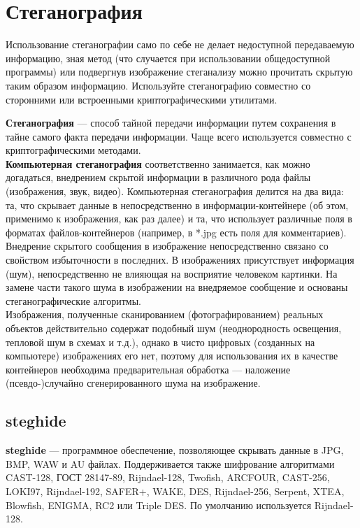 \section{Стеганография}
\begin{important}
Использование стеганографии само по себе не делает недоступной передаваемую информацию, зная метод (что случается при использовании общедоступной программы) или подвергнув изображение стеганализу можно прочитать скрытую таким образом информацию. Используйте стеганографию совместно со сторонними или встроенными криптографическими утилитами.
\end{important}
\textbf{Стеганография} --- способ тайной передачи информации путем сохранения в тайне самого факта передачи информации. Чаще всего используется совместно с криптографическими методами.\\
\textbf{Компьютерная стеганография} соответственно занимается, как можно догадаться, внедрением скрытой информации в различного рода файлы (изображения, звук, видео). Компьютерная стеганография делится на два вида: та, что скрывает данные в непосредственно в информации-контейнере (об этом, применимо к изображения, как раз далее) и та, что использует различные поля в форматах файлов-контейнеров (например, в *.jpg есть поля для комментариев).\\
Внедрение скрытого сообщения в изображение непосредственно связано со свойством избыточности в последних. В изображениях присутствует информация (шум), непосредственно не влияющая на восприятие человеком картинки. На замене части такого шума в изображении на внедряемое сообщение и основаны стеганографические алгоритмы.\\
Изображения, полученные сканированием (фотографированием) реальных объектов действительно содержат подобный шум (неоднородность освещения, тепловой шум в схемах и т.д.), однако в чисто цифровых (созданных на компьютере) изображениях его нет, поэтому для использования их в качестве контейнеров необходима предварительная обработка --- наложение (псевдо-)случайно сгенерированного шума на изображение.
\subsection{steghide}
\textbf{steghide} --- программное обеспечение, позволяющее скрывать данные в JPG, BMP, WAW и AU файлах. Поддерживается также шифрование алгоритмами CAST-128, ГОСТ 28147-89, Rijndael-128, Twofish, ARCFOUR, CAST-256, LOKI97, Rijndael-192, SAFER+, WAKE, DES, Rijndael-256, Serpent, XTEA, Blowfish, ENIGMA, RC2 или Triple DES. По умолчанию используется Rijndael-128.
